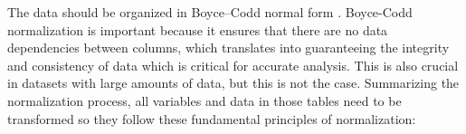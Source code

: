 




\label{relationalNormalization}

The data should be organized in Boyce–Codd normal form \cite{ref:KOHLER201888}. Boyce-Codd normalization is important because it ensures that there are no data dependencies between columns, which translates into guaranteeing the integrity and consistency of data which is critical for accurate analysis. This is also crucial in datasets with large amounts of data, but this is not the case. Summarizing the normalization process, all variables and data in those tables need to be transformed so they follow these fundamental principles of normalization:


